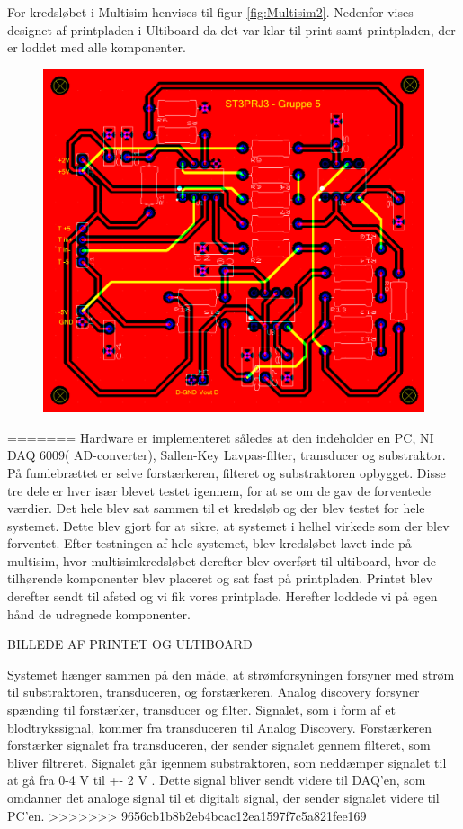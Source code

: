 For kredsløbet i Multisim henvises til figur \vref{fig:Multisim2}. Nedenfor vises designet af printpladen i Ultiboard da det var klar til print samt printpladen, der er loddet med alle komponenter.

\begin{figure}[h!]
	\centering
	\includegraphics[width=0.5\linewidth]{../Rapport/Implementering_og_test/Hardware/Ultiboard}
	\caption[Print i Ultiboard]{}
	\label{fig:ultiboard1}
\end{figure}

=======
Hardware er implementeret således at den indeholder en PC, NI DAQ 6009( AD-converter), Sallen-Key Lavpas-filter, transducer og substraktor. På fumlebrættet er selve forstærkeren, filteret og substraktoren opbygget. Disse tre dele er hver især blevet testet igennem, for at se om de gav de forventede værdier. Det hele blev sat sammen til et kredsløb og der blev testet for hele systemet. Dette blev gjort for at sikre, at systemet i helhel virkede som der blev forventet. Efter testningen af hele systemet, blev kredsløbet lavet inde på multisim, hvor multisimkredsløbet derefter blev overført til ultiboard, hvor de tilhørende komponenter blev placeret og sat fast på printpladen.  Printet blev derefter sendt til afsted og vi fik vores printplade. Herefter loddede vi på egen hånd de udregnede komponenter. 

BILLEDE AF PRINTET OG ULTIBOARD

Systemet hænger sammen på den måde, at strømforsyningen forsyner med strøm til substraktoren, transduceren,  og forstærkeren. Analog discovery forsyner spænding til forstærker, transducer og filter.
Signalet, som i form af et blodtrykssignal, kommer fra transduceren til Analog Discovery.  Forstærkeren forstærker signalet fra transduceren, der sender signalet gennem filteret, som bliver filtreret. Signalet går igennem substraktoren, som neddæmper signalet til at gå fra 0-4 V til +- 2 V . Dette signal bliver sendt videre til DAQ’en, som omdanner det analoge signal til et digitalt signal, der sender signalet videre til PC’en. 
>>>>>>> 9656cb1b8b2eb4bcac12ea1597f7c5a821fee169



